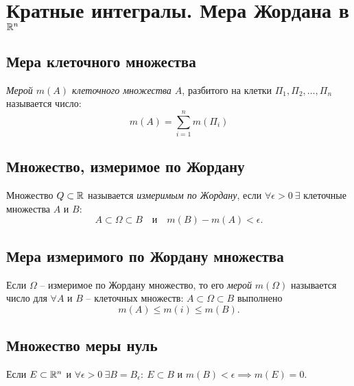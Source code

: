 \section{Кратные интегралы. Мера Жордана в $\mathbb{R}^n$}

\setcounter{subsection}{86}

\subsection{Мера клеточного множества}

\begin{definition}
    \emph{Мерой $m(A)$ клеточного множества $A$}, разбитого на клетки $\Pi_1,\Pi_2,\ldots,\Pi_n$ называется число:
    \begin{equation}\label{eq:8.1.3}
        m(A) = \sum_{i=1}^{n}m(\Pi_i)
    \end{equation}
\end{definition}

\subsection{Множество, измеримое по Жордану}

\begin{definition}
    Множество $ Q \subset \mathbb{R} $ называется \emph{измеримым по Жордану}, если $ \forall \epsilon > 0 \ \exists $ клеточные множества $ A $ и $ B $:
    \[
        A \subset \Omega \subset B \quad \text{и} \quad m(B) - m(A) < \epsilon.
    \]
\end{definition}

\subsection{Мера измеримого по Жордану множества}

\begin{definition}
    Если $ \Omega $ -- измеримое по Жордану множество, то его \emph{мерой} $ m(\Omega) $ называется число для $ \forall A $ и $ B $ -- клеточных множеств: $ A \subset \Omega \subset B $ выполнено
    \[
        m(A) \leqslant m(i) \leqslant m(B).
    \]
\end{definition}

\subsection{Множество меры нуль}

\begin{statement}
    Если $ E \subset \mathbb{R}^n $ и $ \forall \epsilon > 0 \ \exists B = B_\epsilon: \ E \subset B $ и $ m(B) < \epsilon \implies m(E) = 0 $.
\end{statement}

